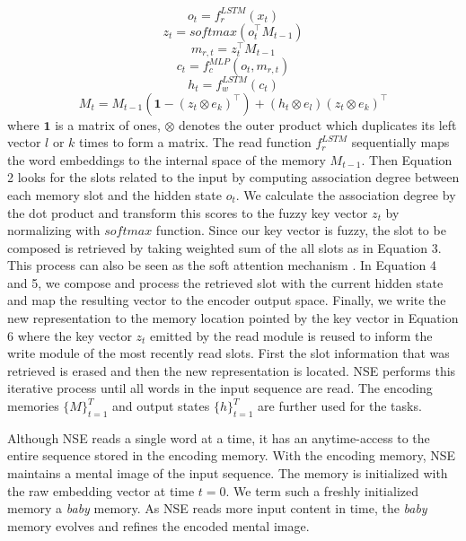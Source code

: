 \documentclass{article}
\begin{document}
\begin{equation}
o_t = f^{LSTM}_r(x_t)
\end{equation}
\begin{equation}
z_t = softmax(o_t^{\top} M_{t-1})
\end{equation}
\begin{equation}
m_{r,t} = z_t^{\top} M_{t-1}
\end{equation}
\begin{equation}
c_t = f^{MLP}_c(o_t, m_{r,t})
\end{equation}
\begin{equation}
h_t = f^{LSTM}_w(c_t)
\end{equation}
\begin{equation}
M_t = M_{t-1}(\textbf{1}-(z_t \otimes e_k)^{\top}) + (h_t \otimes e_l) (z_t \otimes e_k)^{\top}
\end{equation}
where $\textbf{1}$ is a matrix of ones, $\otimes$ denotes the outer product which duplicates its left vector $l$ or $k$ times to form a matrix. The read function $f^{LSTM}_r$ sequentially maps the word embeddings to the internal space of the memory $M_{t-1}$. Then Equation 2 looks for the slots related to the input by computing association degree between each memory slot and the hidden state $o_t$. We calculate the association degree by the dot product and transform this scores to the fuzzy key vector $z_t$ by normalizing with $softmax$ function. Since our key vector is fuzzy, the slot to be composed is retrieved by taking weighted sum of the all slots as in Equation 3. This process can also be seen as the soft attention mechanism \cite{bahdanau:15}. In Equation 4 and 5, we compose and process the retrieved slot with the current hidden state and map the resulting vector to the encoder output space. Finally, we write the new representation to the memory location pointed by the key vector in Equation 6 where the key vector $z_t$ emitted by the read module is reused to inform the write module of the most recently read slots. First the slot information that was retrieved is erased and then the new representation is located. NSE performs this iterative process until all words in the input sequence are read. The encoding memories $\lbrace M \rbrace ^T_{t=1}$ and output states $\lbrace h \rbrace ^T_{t=1}$ are further used for the tasks.

Although NSE reads a single word at a time, it has an anytime-access to the entire sequence stored in the encoding memory. With the encoding memory, NSE maintains a mental image of the input sequence. The memory is initialized with the raw embedding vector at time $t=0$. We term such a freshly initialized memory a \textit{baby} memory. As NSE reads more input content in time, the \textit{baby} memory evolves and refines the encoded mental image. 
\end{document}
